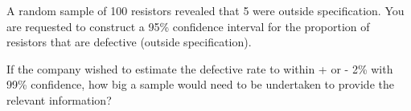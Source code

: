 
 \item A random sample of 100 resistors revealed that 5 were outside specification.  You are requested to construct a 95\% confidence interval for the proportion of resistors that are defective (outside specification).
 
 If the company wished to estimate the defective rate to within + or - 2\% with 99\% confidence, how big a sample would need to be undertaken to provide the relevant information?

 


